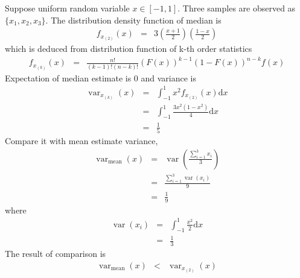 \documentclass{article}
\newcommand{\mathd}{\mathrm{d}}
\newcommand{\tmop}[1]{\ensuremath{\operatorname{#1}}}
\begin{document}
Suppose uniform random variable $x \in [- 1, 1]$. Three samples are observed
as $\{ x_1, x_2, x_3 \}$. The distribution density function of median is
\begin{eqnarray*}
  f_{x_{(2)}} (x) & = & 3 \left( \frac{x + 1}{2} \right) \left( \frac{1 -
  x}{2} \right)
\end{eqnarray*}
which is deduced from distribution function of k-th order statistics
\begin{eqnarray*}
  f_{x_{(k)}} (x) & = & \frac{n!}{(k - 1) ! (n - k) !} (F (x))^{k - 1} (1 - F
  (x))^{n - k} f (x)
\end{eqnarray*}
Expectation of median estimate is 0 and variance is
\begin{eqnarray*}
  \tmop{var}_{x_{(k)}} (x) & = & \int_{- 1}^1 x^2 f_{x_{(2)}} (x) \mathd x\\
  & = & \int_{- 1}^1 \frac{3 x^2 (1 - x^2)}{4} \mathd x\\
  & = & \frac{1}{5}
\end{eqnarray*}
Compare it with mean estimate variance,
\begin{eqnarray*}
  \tmop{var}_{\tmop{mean}} (x) & = & \tmop{var} \left( \frac{\sum_{i = 1}^3
  x_i}{3} \right)\\
  & = & \frac{\sum_{i = 1}^3 \tmop{var} (x_i)}{9}\\
  & = & \frac{1}{9}
\end{eqnarray*}
where
\begin{eqnarray*}
  \tmop{var} (x_i) & = & \int_{- 1}^1 \frac{x^2}{2} \mathd x\\
  & = & \frac{1}{3}
\end{eqnarray*}
The result of comparison is
\begin{eqnarray*}
  \tmop{var}_{\tmop{mean}} (x) & < & \tmop{var}_{x_{(2)}} (x)
\end{eqnarray*}
\end{document}
